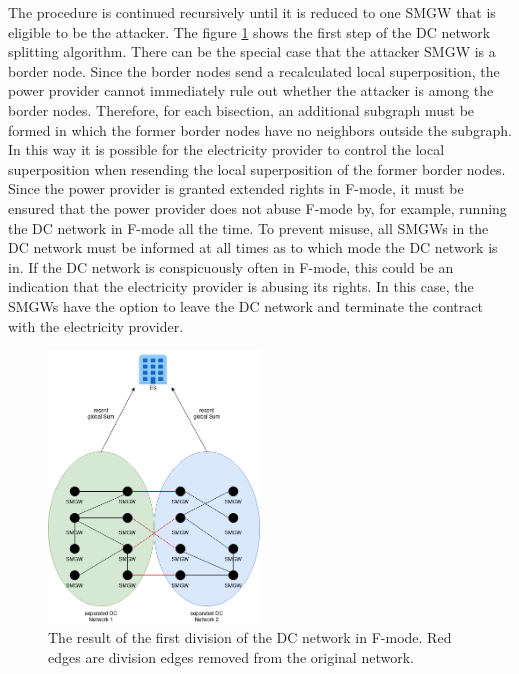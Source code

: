 The procedure is continued recursively until it is reduced to one SMGW that is eligible to be the attacker. The figure \ref{fig:FirstSplitting} shows the first step of the DC network splitting algorithm.
There can be the special case that the attacker SMGW is a border node. Since the border nodes send a recalculated local superposition, the power provider cannot immediately rule out whether the attacker is among the border nodes. Therefore, for each bisection, an additional subgraph must be formed in which the former border nodes have no neighbors outside the subgraph. In this way it is possible for the electricity provider to control the local superposition when resending the local superposition of the former border nodes. \\
Since the power provider is granted extended rights in F-mode, it must be ensured that the power provider does not abuse F-mode by, for example, running the DC network in F-mode all the time. To prevent misuse, all SMGWs in the DC network must be informed at all times as to which mode the DC network is in. If the DC network is conspicuously often in F-mode, this could be an indication that the electricity provider is abusing its rights. In this case, the SMGWs have the option to leave the DC network and terminate the contract with the electricity provider.
\begin{figure}[tbp]
  \centering
  \includegraphics[width=0.5\textwidth]{images/DC Net Split.png}
  \caption[DC Network Splitting Algorithm]{The result of the first division of the DC network in F-mode. Red edges are division edges removed from the original network.}
  \label{fig:FirstSplitting}
\end{figure}

